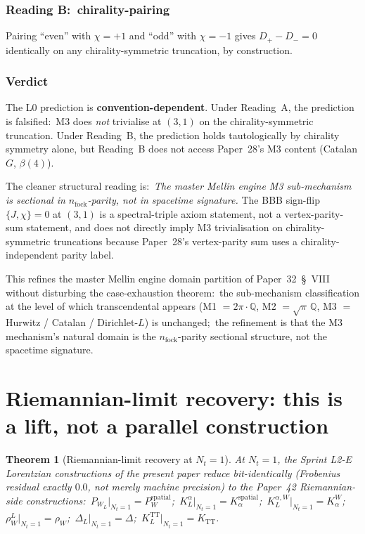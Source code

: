 \documentclass[11pt,a4paper]{article}
\theoremstyle{plain}
\newtheorem{theorem}{Theorem}[section]
\theoremstyle{definition}
\newcommand{\Nt}{N_t}
\newcommand{\Q}{\mathbb{Q}}
\newcommand{\KL}{K_{L}}
\newcommand{\TT}{\mathrm{TT}}
\begin{document}
\subsubsection{Reading B:\ chirality-pairing}

Pairing ``even'' with $\chi = +1$ and ``odd'' with $\chi = -1$
gives $D_+ - D_- = 0$ identically on any chirality-symmetric
truncation, by construction.

\subsubsection{Verdict}

The L0 prediction is \textbf{convention-dependent}. Under Reading~A,
the prediction is falsified:\ M3 does \emph{not} trivialise at $(3, 1)$
on the chirality-symmetric truncation. Under Reading~B, the prediction
holds tautologically by chirality symmetry alone, but Reading~B does
not access Paper~28's M3 content (Catalan $G$, $\beta(4)$).

The cleaner structural reading is:\
\emph{The master Mellin engine M3 sub-mechanism is sectional in
$n_\text{fock}$-parity, not in spacetime signature.} The BBB sign-flip
$\{J, \chi\} = 0$ at $(3, 1)$ is a spectral-triple axiom statement, not
a vertex-parity-sum statement, and does not directly imply M3
trivialisation on chirality-symmetric truncations because Paper~28's
vertex-parity sum uses a chirality-independent parity label.

This refines the master Mellin engine domain partition of Paper~32~\S~VIII
without disturbing the case-exhaustion theorem:\ the
sub-mechanism classification at the level of which transcendental
appears (M1 $= 2\pi \cdot \Q$, M2 $= \sqrt{\pi}\,\Q$, M3
$= $ Hurwitz / Catalan / Dirichlet-$L$) is unchanged;\ the refinement is
that the M3 mechanism's natural domain is the $n_\text{fock}$-parity
sectional structure, not the spacetime signature.

\section{Riemannian-limit recovery: this is a lift, not a parallel
construction}\label{sec:riemannian_lift}

\begin{theorem}[Riemannian-limit recovery at $\Nt = 1$]
\label{thm:riemannian_limit_recovery}
At $\Nt = 1$, the Sprint L2-E Lorentzian constructions of the present
paper reduce \emph{bit-identically} (Frobenius residual exactly $0.0$,
not merely machine precision) to the Paper~42 Riemannian-side
constructions:\
$P_{W_L}|_{\Nt = 1} = P_W^{\mathrm{spatial}}$;\
$\KL^\alpha|_{\Nt = 1} = K_\alpha^{\mathrm{spatial}}$;\
$\KL^{\alpha, W}|_{\Nt = 1} = K_\alpha^W$;\
$\rho_W^L|_{\Nt = 1} = \rho_W$;\
$\Delta_L|_{\Nt = 1} = \Delta$;\
$\KL^\TT|_{\Nt = 1} = K_\TT$.
\end{theorem}
\end{document}
